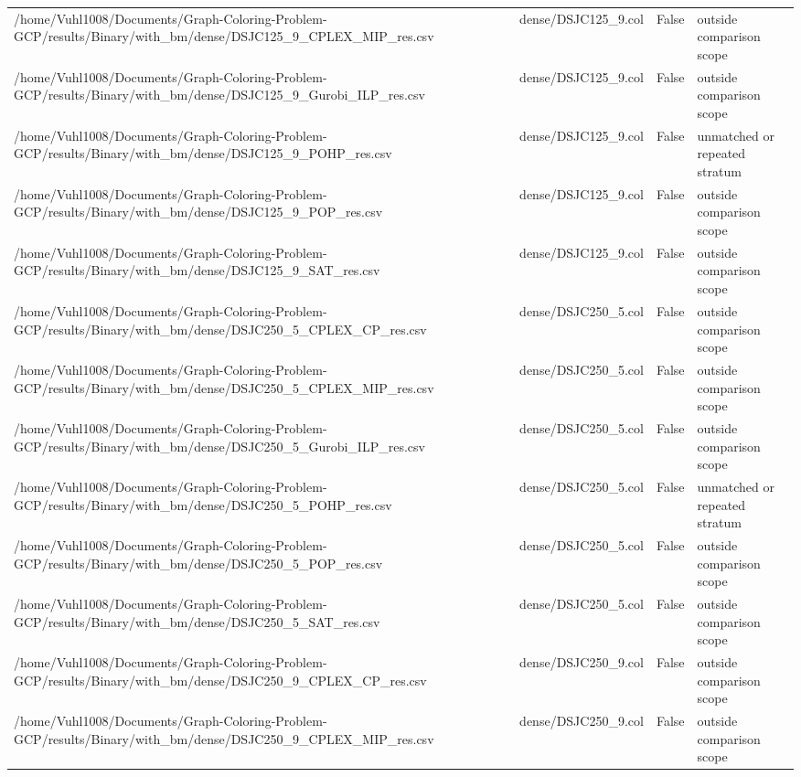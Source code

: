 \begin{table}[htbp]
\begin{tabular}{llll}
/home/Vuhl1008/Documents/Graph-Coloring-Problem-GCP/results/Binary/with\_bm/dense/DSJC125\_9\_CPLEX\_MIP\_res.csv & dense/DSJC125\_9.col & False & outside comparison scope \\
/home/Vuhl1008/Documents/Graph-Coloring-Problem-GCP/results/Binary/with\_bm/dense/DSJC125\_9\_Gurobi\_ILP\_res.csv & dense/DSJC125\_9.col & False & outside comparison scope \\
/home/Vuhl1008/Documents/Graph-Coloring-Problem-GCP/results/Binary/with\_bm/dense/DSJC125\_9\_POHP\_res.csv & dense/DSJC125\_9.col & False & unmatched or repeated stratum \\
/home/Vuhl1008/Documents/Graph-Coloring-Problem-GCP/results/Binary/with\_bm/dense/DSJC125\_9\_POP\_res.csv & dense/DSJC125\_9.col & False & outside comparison scope \\
/home/Vuhl1008/Documents/Graph-Coloring-Problem-GCP/results/Binary/with\_bm/dense/DSJC125\_9\_SAT\_res.csv & dense/DSJC125\_9.col & False & outside comparison scope \\
/home/Vuhl1008/Documents/Graph-Coloring-Problem-GCP/results/Binary/with\_bm/dense/DSJC250\_5\_CPLEX\_CP\_res.csv & dense/DSJC250\_5.col & False & outside comparison scope \\
/home/Vuhl1008/Documents/Graph-Coloring-Problem-GCP/results/Binary/with\_bm/dense/DSJC250\_5\_CPLEX\_MIP\_res.csv & dense/DSJC250\_5.col & False & outside comparison scope \\
/home/Vuhl1008/Documents/Graph-Coloring-Problem-GCP/results/Binary/with\_bm/dense/DSJC250\_5\_Gurobi\_ILP\_res.csv & dense/DSJC250\_5.col & False & outside comparison scope \\
/home/Vuhl1008/Documents/Graph-Coloring-Problem-GCP/results/Binary/with\_bm/dense/DSJC250\_5\_POHP\_res.csv & dense/DSJC250\_5.col & False & unmatched or repeated stratum \\
/home/Vuhl1008/Documents/Graph-Coloring-Problem-GCP/results/Binary/with\_bm/dense/DSJC250\_5\_POP\_res.csv & dense/DSJC250\_5.col & False & outside comparison scope \\
/home/Vuhl1008/Documents/Graph-Coloring-Problem-GCP/results/Binary/with\_bm/dense/DSJC250\_5\_SAT\_res.csv & dense/DSJC250\_5.col & False & outside comparison scope \\
/home/Vuhl1008/Documents/Graph-Coloring-Problem-GCP/results/Binary/with\_bm/dense/DSJC250\_9\_CPLEX\_CP\_res.csv & dense/DSJC250\_9.col & False & outside comparison scope \\
/home/Vuhl1008/Documents/Graph-Coloring-Problem-GCP/results/Binary/with\_bm/dense/DSJC250\_9\_CPLEX\_MIP\_res.csv & dense/DSJC250\_9.col & False & outside comparison scope \\

\end{tabular}
\end{table}
